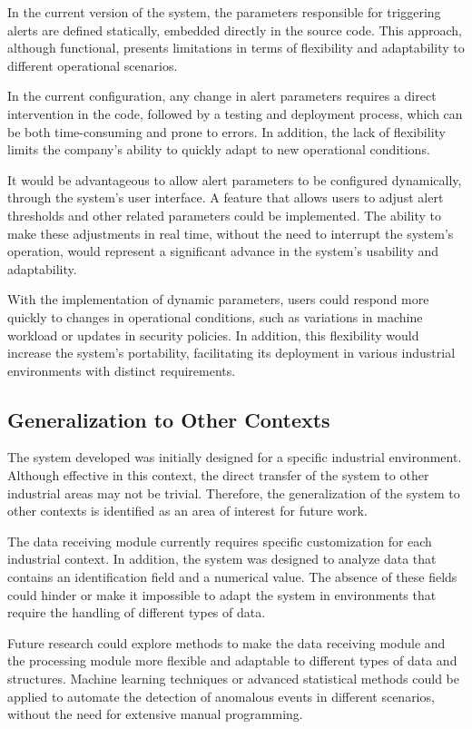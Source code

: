 In the current version of the system, the parameters responsible for triggering alerts are defined statically, embedded directly in the source code. This approach, although functional, presents limitations in terms of flexibility and adaptability to different operational scenarios.

In the current configuration, any change in alert parameters requires a direct intervention in the code, followed by a testing and deployment process, which can be both time-consuming and prone to errors. In addition, the lack of flexibility limits the company's ability to quickly adapt to new operational conditions.

It would be advantageous to allow alert parameters to be configured dynamically, through the system's user interface. A feature that allows users to adjust alert thresholds and other related parameters could be implemented. The ability to make these adjustments in real time, without the need to interrupt the system's operation, would represent a significant advance in the system's usability and adaptability.

With the implementation of dynamic parameters, users could respond more quickly to changes in operational conditions, such as variations in machine workload or updates in security policies. In addition, this flexibility would increase the system's portability, facilitating its deployment in various industrial environments with distinct requirements.

\subsection{Generalization to Other Contexts}

The system developed was initially designed for a specific industrial environment. Although effective in this context, the direct transfer of the system to other industrial areas may not be trivial. Therefore, the generalization of the system to other contexts is identified as an area of interest for future work.

The data receiving module currently requires specific customization for each industrial context. In addition, the system was designed to analyze data that contains an identification field and a numerical value. The absence of these fields could hinder or make it impossible to adapt the system in environments that require the handling of different types of data.

Future research could explore methods to make the data receiving module and the processing module more flexible and adaptable to different types of data and structures. Machine learning techniques or advanced statistical methods could be applied to automate the detection of anomalous events in different scenarios, without the need for extensive manual programming.

